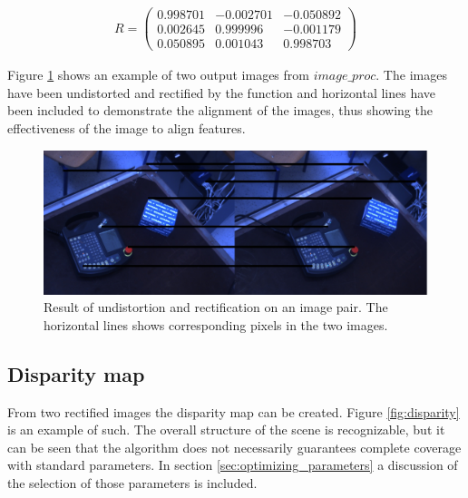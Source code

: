 \begin{equation}\label{eq:rectification}
\begin{split}
R =
 \begin{pmatrix}
  0.998701 & -0.002701 & -0.050892 \\
  0.002645 & 0.999996 & -0.001179 \\
  0.050895 & 0.001043 & 0.998703 
 \end{pmatrix}
\end{split}
\end{equation}

Figure \ref{fig:rectified} shows an example of two output images from $image\_proc$. The images have been undistorted and rectified by the function and horizontal lines have been included to demonstrate the alignment of the images, thus showing the effectiveness of the image to align features.

\begin{figure}[h!]
  \centering
    \includegraphics[width=\textwidth]{graphics/06_vision/rectified.jpg}
      \caption{Result of undistortion and rectification on an image pair. The horizontal lines shows corresponding pixels in the two images.}
    \label{fig:rectified}
\end{figure}

\subsection{Disparity map}

From two rectified images the disparity map can be created. Figure \ref{fig:disparity} is an example of such. The overall structure of the scene is recognizable, but it can be seen that the algorithm does not necessarily guarantees complete coverage with standard parameters. In section \ref{sec:optimizing_parameters} a discussion of the selection of those parameters is included.

